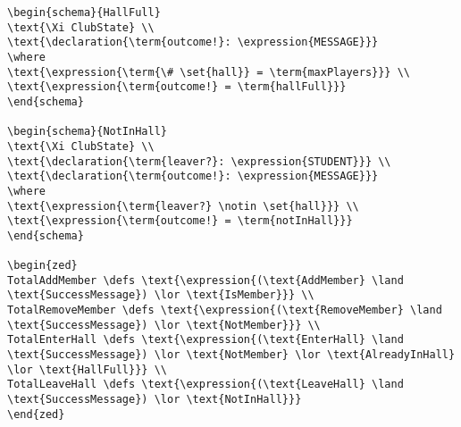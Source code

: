 \begin{verbatim}
\begin{schema}{HallFull}
\text{\Xi ClubState} \\
\text{\declaration{\term{outcome!}: \expression{MESSAGE}}}
\where
\text{\expression{\term{\# \set{hall}} = \term{maxPlayers}}} \\
\text{\expression{\term{outcome!} = \term{hallFull}}}
\end{schema}

\begin{schema}{NotInHall}
\text{\Xi ClubState} \\
\text{\declaration{\term{leaver?}: \expression{STUDENT}}} \\
\text{\declaration{\term{outcome!}: \expression{MESSAGE}}}
\where
\text{\expression{\term{leaver?} \notin \set{hall}}} \\
\text{\expression{\term{outcome!} = \term{notInHall}}}
\end{schema}

\begin{zed}
TotalAddMember \defs \text{\expression{(\text{AddMember} \land \text{SuccessMessage}) \lor \text{IsMember}}} \\
TotalRemoveMember \defs \text{\expression{(\text{RemoveMember} \land \text{SuccessMessage}) \lor \text{NotMember}}} \\
TotalEnterHall \defs \text{\expression{(\text{EnterHall} \land \text{SuccessMessage}) \lor \text{NotMember} \lor \text{AlreadyInHall} \lor \text{HallFull}}} \\
TotalLeaveHall \defs \text{\expression{(\text{LeaveHall} \land \text{SuccessMessage}) \lor \text{NotInHall}}}
\end{zed}


\end{verbatim}